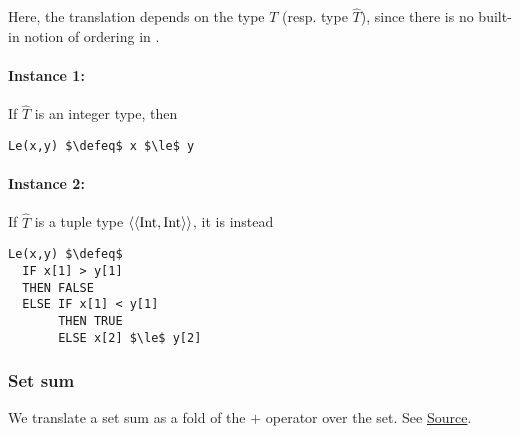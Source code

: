 Here, the translation depends on the type $T$ (resp. type $\hat{T}$), since there is no built-in notion of ordering in \tlap{}. 
\paragraph{Instance 1:} If $\hat{T}$ is an integer type, then 
\begin{lstlisting}[language=tla,columns=fullflexible]
Le(x,y) $\defeq$ x $\le$ y
\end{lstlisting}
\paragraph{Instance 2:} If $\hat{T}$ is a tuple type $\tup{\Int,\Int}$, it is instead 
\begin{lstlisting}[language=tla,columns=fullflexible]
Le(x,y) $\defeq$ 
  IF x[1] > y[1]
  THEN FALSE
  ELSE IF x[1] < y[1]
       THEN TRUE
       ELSE x[2] $\le$ y[2]
\end{lstlisting}

\subsubsection{ Set sum}





\begin{mathpar}
\end{mathpar}

We translate a set sum as a fold of the $+$ operator over the set. See
\href{https://github.com/saltiniroberto/ssf/blob/7ea6e18093d9da3154b4e396dd435549f687e6b9/high_level/common/pythonic_code_generic.py#L79-L80}{Source}.

